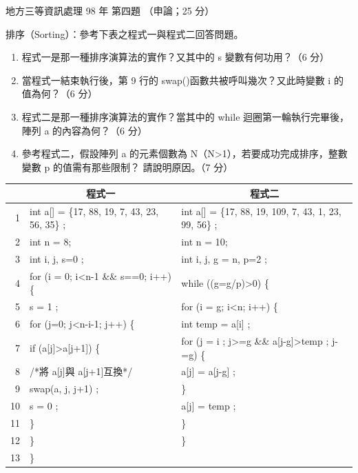 \begin{pastexam}[label={px:df3-098-ds-04}]{地方三等資訊處理 98 年 第四題}
（申論；25 分）

排序（Sorting）：參考下表之程式一與程式二回答問題。
\begin{enumerate}[leftmargin=2.2em]
\item[㈠] 程式一是那一種排序演算法的實作？又其中的 s 變數有何功用？（6 分）
\item[㈡] 當程式一結束執行後，第 9 行的 swap()函數共被呼叫幾次？又此時變數 i 的值為何？（6 分）
\item[㈢] 程式二是那一種排序演算法的實作？當其中的 while 迴圈第一輪執行完畢後，陣列 a 的內容為何？（6 分）
\item[㈣] 參考程式二，假設陣列 a 的元素個數為 N（N>1），若要成功完成排序，整數變數 p 的值需有那些限制？
請說明原因。（7 分）
\end{enumerate}
\begin{center}
\footnotesize
\begin{tabular}{|r|l|l|}
\hline
 & \multicolumn{1}{c|}{程式一} & \multicolumn{1}{c|}{程式二} \\
\hline
1 & int a[] = \{17, 88, 19, 7, 43, 23, 56, 35\} ; & int a[] = \{17, 88, 19, 109, 7, 43, 1, 23, 99, 56\} ; \\
2 & int n = 8; & int n = 10; \\
3 & int i, j, s=0 ; & int i, j, g = n, p=2 ; \\
4 & for (i = 0; i<n-1 \&\& s==0; i++)\{ & while ((g=g/p)>0) \{ \\
5 & \hspace*{1.5em}s = 1 ; & \hspace*{1.5em}for (i = g; i<n; i++) \{ \\
6 & \hspace*{1.5em}for (j=0; j<n-i-1; j++) \{ & \hspace*{3em}int temp = a[i] ; \\
7 & \hspace*{3em}if (a[j]>a[j+1]) \{ & \hspace*{3em}for (j = i ; j>=g \&\& a[j-g]>temp ; j-=g) \{ \\
8 & \hspace*{4.5em}/*將 a[j]與 a[j+1]互換*/ & \hspace*{4.5em}a[j] = a[j-g] ; \\
9 & \hspace*{4.5em}swap(a, j, j+1) ; & \hspace*{3em}\} \\
10 & \hspace*{4.5em}s = 0 ; & \hspace*{3em}a[j] = temp ; \\
11 & \hspace*{3em}\} & \hspace*{1.5em}\} \\
12 & \hspace*{1.5em}\} & \} \\
13 & \} & \\
\hline
\end{tabular}
\end{center}
\end{pastexam}

